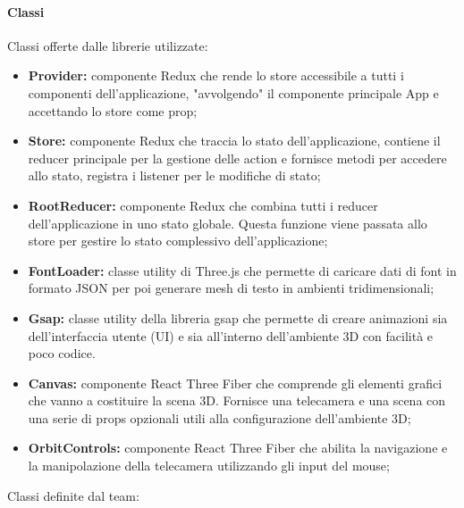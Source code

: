 \paragraph{Classi}
Classi offerte dalle librerie utilizzate:
\begin{itemize}
    \item \textbf{Provider:} componente Redux che rende lo store accessibile a tutti i componenti dell'applicazione, "avvolgendo" il componente principale App e accettando lo store come prop;
    \item \textbf{Store:} componente Redux che traccia lo stato dell'applicazione, contiene il reducer principale per la gestione delle action e fornisce metodi per accedere allo stato,
          registra i listener per le modifiche di stato;
    \item \textbf{RootReducer:} componente Redux che combina tutti i reducer dell'applicazione in uno stato
          globale. Questa funzione viene passata allo store per gestire lo stato complessivo dell'applicazione;
    \item \textbf{FontLoader:} classe utility di Three.js che permette di caricare dati di font in formato JSON per poi generare mesh di testo in ambienti tridimensionali;
    \item \textbf{Gsap:} classe utility della libreria gsap che permette di creare animazioni sia dell'interfaccia utente (UI) e sia all'interno dell'ambiente 3D con facilità e poco codice.
    \item \textbf{Canvas:} componente React Three Fiber che comprende gli elementi grafici che vanno a costituire la scena 3D.
          Fornisce una telecamera e una scena con una serie di props opzionali utili alla configurazione dell'ambiente 3D;
    \item \textbf{OrbitControls:} componente React Three Fiber che abilita la navigazione e la manipolazione della telecamera utilizzando gli input del mouse;
\end{itemize}
Classi definite dal team:
